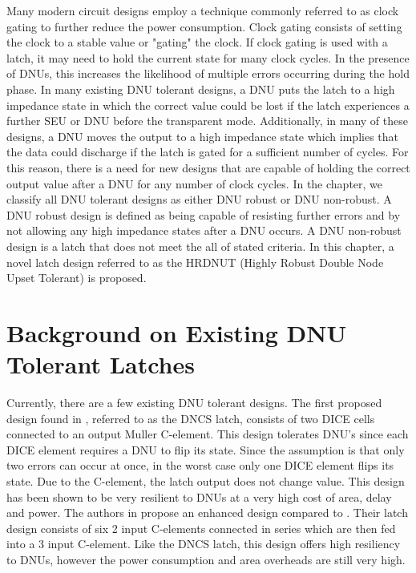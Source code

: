 Many modern circuit designs employ a technique commonly referred to as clock gating to further reduce the power consumption. Clock gating consists of setting the clock to a stable value or "gating" the clock. If clock gating is used with a latch, it may need to hold the current state for many clock cycles. In the presence of DNUs, this increases the likelihood of multiple errors occurring during the hold phase. In many existing DNU tolerant designs, a DNU puts the latch to a high impedance state in which the correct value could be lost if the latch experiences a further SEU or DNU before the transparent mode. Additionally, in many of these designs, a DNU moves the output to a high impedance state which implies that the data could discharge if the latch is gated for a sufficient number of cycles. For this reason, there is a need for new designs that are capable of holding the correct output value after a DNU for any number of clock cycles. In the chapter, we classify all DNU tolerant designs as either DNU robust or DNU non-robust. A DNU robust design is defined as being capable of resisting further errors and by not allowing any high impedance states after a DNU occurs. A DNU non-robust design is a latch that does not meet the all of stated criteria. In this chapter, a novel latch design referred to as the HRDNUT (Highly Robust Double Node Upset Tolerant) is proposed.

\section{Background on Existing DNU Tolerant Latches} \label{sec:DNUex}

Currently, there are a few existing DNU tolerant designs. The first proposed design found in \cite{DNCS}, referred to as the DNCS latch, consists of two DICE cells connected to an output Muller C-element. This design tolerates DNU's since each DICE element requires a DNU to flip its state. Since the assumption is that only two errors can occur at once, in the worst case only one DICE element flips its state. Due to the C-element, the latch output does not change value. This design has been shown to be very resilient to DNUs at a very high cost of area, delay and power. The authors in \cite{Inter} propose an enhanced design compared to \cite{DNCS}. Their latch design consists of six 2 input C-elements connected in series which are then fed into a 3 input C-element. Like the DNCS latch, this design offers high resiliency to DNUs, however the power consumption and area overheads are still very high. 

